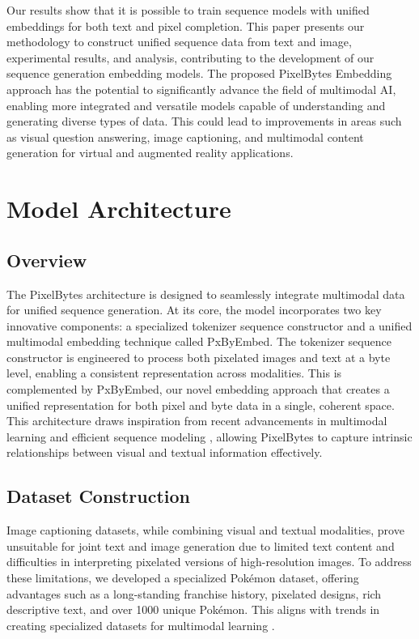 \documentclass[10pt,a4paper]{article}
\begin{document}
Our results show that it is possible to train sequence models with unified embeddings for both text and pixel completion. This paper presents our methodology to construct unified sequence data from text and image, experimental results, and analysis, contributing to the development of our sequence generation embedding models. The proposed PixelBytes Embedding approach has the potential to significantly advance the field of multimodal AI, enabling more integrated and versatile models capable of understanding and generating diverse types of data. This could lead to improvements in areas such as visual question answering, image captioning, and multimodal content generation for virtual and augmented reality applications.

\section{Model Architecture}

\subsection{Overview}
The PixelBytes architecture is designed to seamlessly integrate multimodal data for unified sequence generation. At its core, the model incorporates two key innovative components: a specialized tokenizer sequence constructor and a unified multimodal embedding technique called PxByEmbed. The tokenizer sequence constructor is engineered to process both pixelated images and text at a byte level, enabling a consistent representation across modalities. This is complemented by PxByEmbed, our novel embedding approach that creates a unified representation for both pixel and byte data in a single, coherent space. This architecture draws inspiration from recent advancements in multimodal learning \cite{baltrusaitis2019multimodal} and efficient sequence modeling \cite{vaswani2017attention}, allowing PixelBytes to capture intrinsic relationships between visual and textual information effectively.

\subsection{Dataset Construction}

Image captioning datasets, while combining visual and textual modalities, prove unsuitable for joint text and image generation due to limited text content and difficulties in interpreting pixelated versions of high-resolution images. To address these limitations, we developed a specialized Pokémon dataset, offering advantages such as a long-standing franchise history, pixelated designs, rich descriptive text, and over 1000 unique Pokémon. This aligns with trends in creating specialized datasets for multimodal learning \cite{lin2014microsoft}. 
\end{document}
